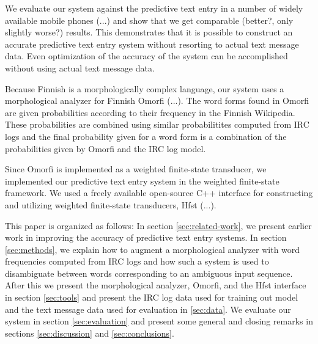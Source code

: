 \documentclass[a4paper,conference]{IEEEtran}
\begin{document}
We evaluate our system against the predictive text entry in a number
of widely available mobile phones (...) and show that we get
comparable (better?, only slightly worse?) results. This demonstrates
that it is possible to construct an accurate predictive text entry
system without resorting to actual text message data. Even
optimization of the accuracy of the system can be accomplished without
using actual text message data.

Because Finnish is a morphologically complex language, our system uses
a morphological analyzer for Finnish Omorfi (...). The word forms
found in Omorfi are given probabilities according to their frequency
in the Finnish Wikipedia. These probabilities are combined using
similar probabilitites computed from IRC logs and the final
probability given for a word form is a combination of the probabilities
given by Omorfi and the IRC log model.

Since Omorfi is implemented as a weighted finite-state transducer, we
implemented our predictive text entry system in the weighted
finite-state framework. We used a freely available open-source C++
interface for constructing and utilizing weighted finite-state transducers,
Hfst (...).

This paper is organized as follows: In section \ref{sec:related-work},
we present earlier work in improving the accuracy of predictive text
entry systems. In section \ref{sec:methods}, we explain how to augment
a morphological analyzer with word frequencies computed from IRC logs
and how such a system is used to disambiguate between words
corresponding to an ambiguous input sequence. After this we present
the morphological analyzer, Omorfi, and the Hfst interface in section
\ref{sec:tools} and present the IRC log data used for training out model
and the text message data used for evaluation in \ref{sec:data}. We
evaluate our system in section \ref{sec:evaluation} and present some
general and closing remarks in sections \ref{sec:discussion} and
\ref{sec:conclusions}.

\end{document}
